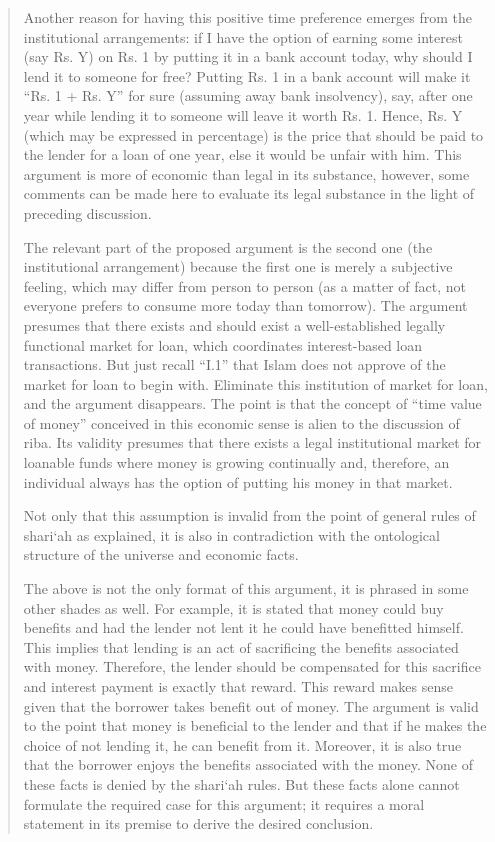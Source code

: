 \begin{quote}
Another reason for having this positive time preference emerges from the institutional arrangements: if I have the option of earning some interest (say Rs. Y) on Rs. 1 by putting it in a bank account today, why should I lend it to someone for free? Putting Rs. 1 in a bank account will make it “Rs. 1 + Rs. Y” for sure (assuming away bank insolvency), say, after one year while lending it to someone will leave it worth Rs. 1. Hence, Rs. Y (which may be expressed in percentage) is the price that should be paid to the lender for a loan of one year, else it would be unfair with him. This argument is more of economic than legal in its substance, however, some comments can be made here to evaluate its legal substance in the light of preceding discussion.

The relevant part of the proposed argument is the second one (the institutional arrangement) because the first one is merely a subjective feeling, which may differ from person to person (as a matter of fact, not everyone prefers to consume more today than tomorrow). The argument presumes that there exists and should exist a well-established legally functional market for loan, which coordinates interest-based loan transactions. But just recall “I.1” that Islam does not approve of the market for loan to begin with. Eliminate this institution of market for loan, and the argument disappears. The point is that the concept of “time value of money” conceived in this economic sense is alien to the discussion of riba. Its validity presumes that there exists a legal institutional market for loanable funds where money is growing continually and, therefore, an individual always has the option of putting his money in that market.

Not only that this assumption is invalid from the point of general rules of shari‘ah as explained, it is also in contradiction with the ontological structure of the universe and economic facts.

The above is not the only format of this argument, it is phrased in some other shades as well. For example, it is stated that money could buy benefits and had the lender not lent it he could have benefitted himself. This implies that lending is an act of sacrificing the benefits associated with money. Therefore, the lender should be compensated for this sacrifice and interest payment is exactly that reward. This reward makes sense given that the borrower takes benefit out of money. The argument is valid to the point that money is beneficial to the lender and that if he makes the choice of not lending it, he can benefit from it. Moreover, it is also true that the borrower enjoys the benefits associated with the money. None of these facts is denied by the shari‘ah rules. But these facts alone cannot formulate the required case for this argument; it requires a moral statement in its premise to derive the desired conclusion.


\end{quote}
